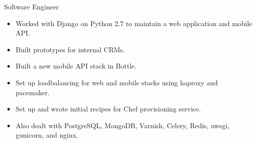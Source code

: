 \documentclass[a4paper]{article}
\begin{document}
\begin{multicols}{3}
            Software Engineer 
            \begin{itemize}
                \item Worked with Django on Python 2.7 to maintain a web application and mobile API.
                \item Built prototypes for internal CRMs.
                \item Built a new mobile API stack in Bottle.
                \item Set up loadbalancing for web and mobile stacks using haproxy and pacemaker.
                \item Set up and wrote initial recipes for Chef provisioning service.
                \item Also dealt with PostgreSQL, MongoDB, Varnish, Celery, Redis, uwsgi, gunicorn, and nginx. 
            \end{itemize}
        \end{multicols}
    \endgroup
\end{document}
